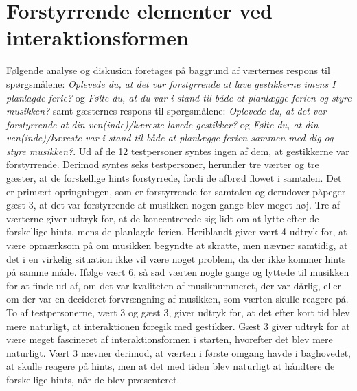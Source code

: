 \section{Forstyrrende elementer ved interaktionsformen}
\label{TestresultaterSocialAcceptForstyrrende}
%
Følgende analyse og diskusion foretages på baggrund af værternes respons til spørgsmålene: \textit{Oplevede du, at det var forstyrrende at lave gestikkerne imens I planlagde ferie?} og \textit{Følte du, at du var i stand til både at planlægge ferien og styre musikken?} samt gæsternes respons til spørgsmålene: \textit{Oplevede du, at det var forstyrrende at din ven(inde)/kæreste lavede gestikker?} og \textit{Følte du, at din ven(inde)/kæreste var i stand til både at planlægge ferien sammen med dig og styre musikken?}. \blankline
%
Ud af de 12 testpersoner syntes ingen af dem, at gestikkerne var forstyrrende. Derimod syntes seks testpersoner, herunder tre værter og tre gæster, at de forskellige hints forstyrrede, fordi de afbrød flowet i samtalen. Det er primært opringningen, som er forstyrrende for samtalen og derudover påpeger gæst 3, at det var forstyrrende at musikken nogen gange blev meget høj. Tre af værterne giver udtryk for, at de koncentrerede sig lidt om at lytte efter de forskellige hints, mens de planlagde ferien. Heriblandt giver vært 4 udtryk for, at være opmærksom på om musikken begyndte at skratte, men nævner samtidig, at det i en virkelig situation ikke vil være noget problem, da der ikke kommer hints på samme måde. Ifølge vært 6, så sad værten nogle gange og lyttede til musikken for at finde ud af, om det var kvaliteten af musiknummeret, der var dårlig, eller om der var en decideret forvrængning af musikken, som værten skulle reagere på. To af testpersonerne, vært 3 og gæst 3, giver udtryk for, at det efter kort tid blev mere naturligt, at interaktionen foregik med gestikker. Gæst 3 giver udtryk for at være meget fascineret af interaktionsformen i starten, hvorefter det blev mere naturligt. Vært 3 nævner derimod, at værten i første omgang havde i baghovedet, at skulle reagere på hints, men at det med tiden blev naturligt at håndtere de forskellige hints, når de blev præsenteret. 

